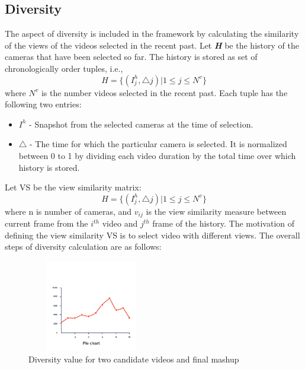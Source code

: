 \documentclass{sig-alternate}
\begin{document}
\subsection{Diversity}
The aspect of diversity is included in the framework by calculating the similarity of the views of the videos selected in the recent past. Let \textit{\textbf{H}} be the history of the cameras that have been selected so far. The history is stored as set of chronologically order tuples, i.e.,
\begin{equation}
H = {\{}(I^h_j , \triangle j)|1 \leq j \leq N^v  {\}}
\end{equation}  
where \(N^v\) is the number videos selected in the recent past. Each tuple has the following two entries: 
\begin{itemize}
\item  \(I^h\) - Snapshot from the selected cameras at the time of selection. 
\item  $\triangle$ - The time for which the particular camera is selected. It is normalized between 0 to 1 by dividing each video duration by the total time over which history is stored. 
\end{itemize}
Let VS be the view similarity matrix:
\begin{equation}
H = {\{}(I^h_j , \triangle j)|1 \leq j \leq N^v  {\}}
\end{equation}  
where n is number of cameras, and \(v_{ij}\) is the view similarity measure between current frame from the \(i^{th}\) video and \(j^{th}\) frame of the history. The motivation of defining the view similarity VS is to select video with different views. The overall steps of diversity calculation are as follows: 
 \begin{figure}[h]
\includegraphics[width=0.5\textwidth ,height = 4cm]{22}
\caption{Diversity value for two candidate videos and ﬁnal mashup}
\label{fig:figure5}
\end{figure}
\end{document}
